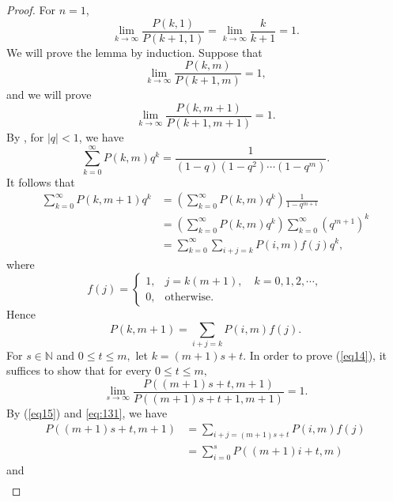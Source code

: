 \documentclass[11pt]{article}
\theoremstyle{plain}
\theoremstyle{definition}
\begin{document}
\begin{proof}
	For $n=1$,
	$$\lim_{k \to \infty} \frac{P(k,1)}{P(k+1,1)} =\lim_{k \to \infty} \frac{k}{k+1} =1.$$
	We will prove the lemma by induction.
	Suppose that
	\begin{equation}\label{eq13}
		\lim_{k \to \infty} \frac{P(k,m)}{P(k+1,m)} =1,
	\end{equation} and we will prove
	\begin{equation}\label{eq14}
		\lim_{k \to \infty} \frac{P(k,m+1)}{P(k+1,m+1)} =1.
	\end{equation}
	By \cite[Page 57]{FJbook}, for $\left | q \right |  <1$, we have
	$$\sum\limits_{k=0}^{\infty }P (k,m)q^{k} =\frac{1}{\left ( 1-q \right ) \left ( 1-q^{2} \right )\cdots\left ( 1-q^{m} \right )  }.$$
	It follows that
	$$\begin{aligned}
		\sum\limits_{k=0}^{\infty }P (k,m+1)q^{k} &=\left ( \sum\limits_{k=0}^{\infty }P (k,m)q^{k} \right ) \frac{1}{ 1-q^{m+1}   }
	\\	&=\left ( \sum\limits_{k=0}^{\infty }P (k,m)q^{k} \right )\sum\limits_{k=0}^{\infty }\left ( q^{m+1}  \right )^{k}
	\\&= \sum\limits_{k=0}^{\infty } \sum\limits_{i+j=k}P(i,m)f(j)q^{k},
	\end{aligned}$$
	where
\begin{equation}
f(j) =
\begin{cases}
1, & j = k(m + 1), \quad k = 0, 1, 2, \cdots, \\
0, & \text{otherwise}.
\end{cases}
\label{eq:131}
\end{equation}
	Hence
	\begin{equation}\label{eq15}
		P (k,m+1)=\sum\limits_{i+j=k}P(i,m)f(j).
	\end{equation}
     For $s \in \mathbb{N}$ and $0 \le t \le m,$ let $k=\left ( m+1 \right )s+t$. In order to prove (\ref{eq14}), it suffices to show that
     for every $0 \le t \le m,$
     $$    \lim_{s \to \infty}\frac{P\left ( \left ( m+1 \right ) s+t,m+1  \right ) }{P\left ( \left ( m+1 \right ) s+t+1,m+1  \right )}=1 .$$
     By (\ref{eq15}) and \eqref{eq:131}, we have
     $$\begin{aligned}
     	P\left ( \left ( m+1 \right ) s+t,m+1  \right ) &=\sum\limits_{i+j=\left ( m+1 \right ) s+t}P(i,m)f(j)
     	\\&= \sum\limits_{i=0}^{s } P(\left ( m+1 \right ) i+t,m)
     \end{aligned}$$
     and
          $$\begin{aligned}

\end{aligned}$$
\end{proof}
\end{document}
